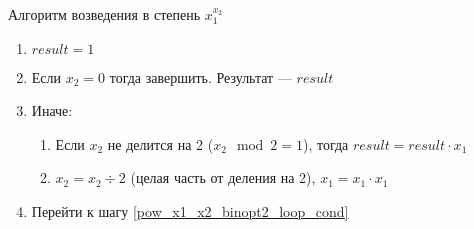Алгоритм возведения в степень $x_1^{x_2}$
\begin{enumerate}
 \item $result = 1$
 \item \label{pow_x1_x2_binopt2_loop_cond} Если $x_2=0$ тогда завершить. Результат --- $result$
 \item Иначе:
 \begin{enumerate}
  \item Если $x_2$ не делится на 2 ($x_2 \mod 2 = 1$), тогда $result = result \cdot x_1$
  \item $x_2 = x_2 \div 2$ (целая часть от деления на 2), $x_1 = x_1 \cdot x_1$
 \end{enumerate}
 \item Перейти к шагу \ref{pow_x1_x2_binopt2_loop_cond}
\end{enumerate}
